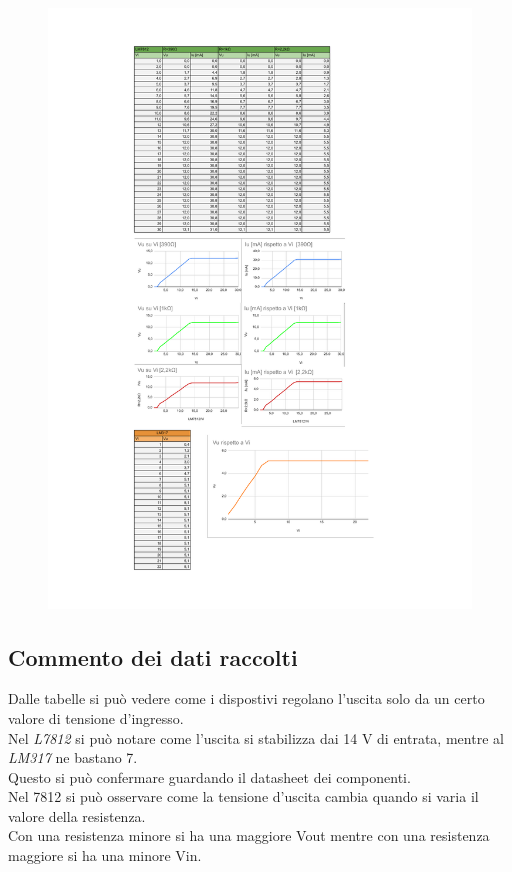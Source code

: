 \documentclass[12pt]{article}
\begin{document}
    \begin{figure}[p]
            \includegraphics[scale=0.9]{tab.pdf}
        \end{figure}
        \subsection{Commento dei dati raccolti}
        Dalle tabelle si può vedere come i dispostivi regolano l’uscita solo da un certo valore di tensione d’ingresso.\\
        Nel \textit{L7812} si può notare come l’uscita si stabilizza dai 14 V di entrata, mentre al \textit{LM317} ne 
        bastano 7.\\
        Questo si può confermare guardando il datasheet dei componenti.\\
        Nel 7812 si può osservare come la tensione d’uscita cambia quando si varia il valore della resistenza.\\
        Con una resistenza minore si ha una maggiore Vout mentre con una resistenza maggiore si ha una minore Vin.\\
\end{document}

